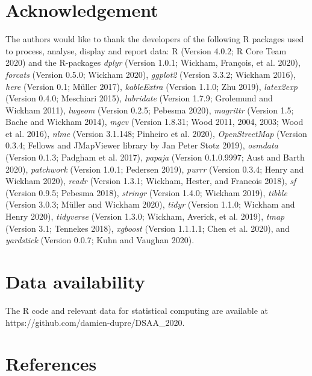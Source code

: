 \documentclass[conference,final,]{IEEEtran}
\begin{document}
\hypertarget{acknowledgement}{%
\section{Acknowledgement}\label{acknowledgement}}

The authors would like to thank the developers of the following R packages used to process, analyse, display and report data: R (Version 4.0.2; R Core Team 2020) and the R-packages \emph{dplyr} (Version 1.0.1; Wickham, François, et al. 2020), \emph{forcats} (Version 0.5.0; Wickham 2020), \emph{ggplot2} (Version 3.3.2; Wickham 2016), \emph{here} (Version 0.1; Müller 2017), \emph{kableExtra} (Version 1.1.0; Zhu 2019), \emph{latex2exp} (Version 0.4.0; Meschiari 2015), \emph{lubridate} (Version 1.7.9; Grolemund and Wickham 2011), \emph{lwgeom} (Version 0.2.5; Pebesma 2020), \emph{magrittr} (Version 1.5; Bache and Wickham 2014), \emph{mgcv} (Version 1.8.31; Wood 2011, 2004, 2003; Wood et al. 2016), \emph{nlme} (Version 3.1.148; Pinheiro et al. 2020), \emph{OpenStreetMap} (Version 0.3.4; Fellows and JMapViewer library by Jan Peter Stotz 2019), \emph{osmdata} (Version 0.1.3; Padgham et al. 2017), \emph{papaja} (Version 0.1.0.9997; Aust and Barth 2020), \emph{patchwork} (Version 1.0.1; Pedersen 2019), \emph{purrr} (Version 0.3.4; Henry and Wickham 2020), \emph{readr} (Version 1.3.1; Wickham, Hester, and Francois 2018), \emph{sf} (Version 0.9.5; Pebesma 2018), \emph{stringr} (Version 1.4.0; Wickham 2019), \emph{tibble} (Version 3.0.3; Müller and Wickham 2020), \emph{tidyr} (Version 1.1.0; Wickham and Henry 2020), \emph{tidyverse} (Version 1.3.0; Wickham, Averick, et al. 2019), \emph{tmap} (Version 3.1; Tennekes 2018), \emph{xgboost} (Version 1.1.1.1; Chen et al. 2020), and \emph{yardstick} (Version 0.0.7; Kuhn and Vaughan 2020).

\hypertarget{data-availability}{%
\section{Data availability}\label{data-availability}}

The R code and relevant data for statistical computing are available at https://github.com/damien-dupre/DSAA\_2020.

\hypertarget{references}{%
\section*{References}\label{references}}
\end{document}
